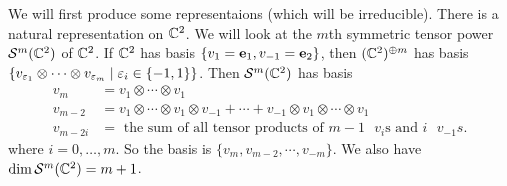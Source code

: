 \begin{exam}[$SU_2$]
  We will first produce some representaions (which will be irreducible).
  There is a natural representation on $\mathbb{C}^2$.
  We will look at the $m$th symmetric tensor power $\mathcal{S}^m(\mathbb{C}^2)$ of $\mathbb{C}^2$.
  If $\mathbb{C}^2$ has basis $\{v_1=\mathbf{e}_1,v_{-1}=\mathbf{e}_2\}$, then $(\mathbb{C}^2)^{\oplus m}$ has basis $\{v_{\varepsilon_1} \otimes \cdots \otimes v_{\varepsilon_m} \mid \varepsilon_i \in \{-1,1\} \}$.
  Then $\mathcal{S}^m(\mathbb{C}^2)$ has basis
  \begin{align*}
    v_m &= v_1 \otimes \cdots \otimes v_1 \\
    v_{m-2} &= v_1 \otimes \cdots \otimes v_1 \otimes v_{-1} + \cdots + v_{-1} \otimes v_1 \otimes \cdots \otimes v_1 \\
    v_{m-2i} &= \text{ the sum of all tensor products of $m-1$ $v_i$s and $i$ $v_{-1}s$.}
  \end{align*}
  where $i=0,\ldots,m$.
  So the basis is $\{ v_m ,v_{m-2}, \cdots, v_{-m}\}$.
  We also have $\dim\mathcal{S}^m(\mathbb{C}^2)=m+1$.


\end{exam}
